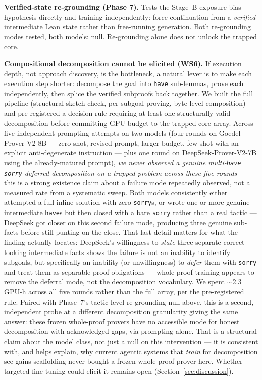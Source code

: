 \documentclass{article}
\begin{document}
\textbf{Verified-state re-grounding (Phase 7).} Tests the Stage~B exposure-bias hypothesis directly and
training-independently: force continuation from a \emph{verified} intermediate Lean state rather than
free-running generation. Both re-grounding modes tested, both models: null. Re-grounding alone does not
unlock the trapped core.

\textbf{Compositional decomposition cannot be elicited (WS6).} If execution depth, not approach
discovery, is the bottleneck, a natural lever is to make each execution step shorter: decompose the
goal into \texttt{have} sub-lemmas, prove each independently, then splice the verified subproofs back
together. We built the full pipeline (structural sketch check, per-subgoal proving, byte-level
composition) and pre-registered a decision rule requiring at least one structurally valid decomposition
before committing GPU budget to the trapped-core array. Across five independent prompting attempts on
two models (four rounds on Goedel-Prover-V2-8B --- zero-shot, revised prompt, larger budget, few-shot
with an explicit anti-degenerate instruction --- plus one round on DeepSeek-Prover-V2-7B using the
already-matured prompt), \emph{we never observed a genuine multi-\texttt{have}
\texttt{sorry}-deferred decomposition on a trapped problem across these five rounds} --- this is a
strong existence claim about a failure mode repeatedly observed, not a measured rate from a systematic
sweep. Both models consistently either attempted a full inline solution with zero \texttt{sorry}s, or
wrote one or more genuine intermediate \texttt{have}s but then closed with a bare \texttt{sorry} rather
than a real tactic --- DeepSeek got closer on this second failure mode, producing three genuine
sub-facts before still punting on the close. That last detail matters for what the finding actually
locates: DeepSeek's willingness to \emph{state} three separate correct-looking intermediate facts shows
the failure is not an inability to identify subgoals, but specifically an inability (or unwillingness)
to \emph{defer} them with \texttt{sorry} and treat them as separable proof obligations --- whole-proof
training appears to remove the deferral mode, not the decomposition vocabulary. We spent $\sim$2.3
GPU-h across all five rounds rather than the full array, per the pre-registered rule. Paired with
Phase~7's tactic-level re-grounding null above, this is a second, independent probe at a different
decomposition granularity giving the same answer: these frozen whole-proof provers have no accessible
mode for honest decomposition with acknowledged gaps, via prompting alone. That is a structural claim
about the model class, not just a null on this
intervention --- it is consistent with, and helps explain, why current agentic systems that
\emph{train} for decomposition see gains scaffolding never bought a frozen whole-proof prover here.
Whether targeted fine-tuning could elicit it remains open (Section~\ref{sec:discussion}).
\end{document}
